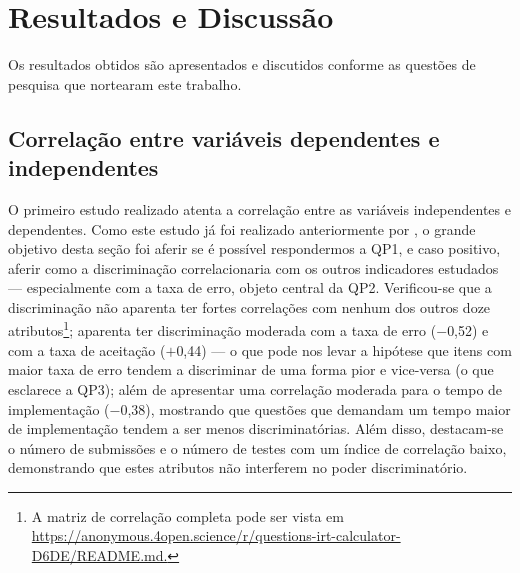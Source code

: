 \documentclass[12pt]{article}
\begin{document}
\section{Resultados e Discussão}


Os resultados obtidos são apresentados e discutidos conforme as questões de pesquisa que nortearam este trabalho.


\subsection{Correlação entre variáveis dependentes e independentes}
\label{sec:correlacao_variaveis}

O primeiro estudo realizado atenta a correlação entre as variáveis independentes e dependentes. Como este estudo já foi realizado anteriormente por \cite{marcos2021,elrik2022,jackson2023}, o grande objetivo desta seção foi aferir se é possível respondermos a QP1, e caso positivo, aferir como a discriminação correlacionaria com os outros indicadores estudados --- especialmente com a taxa de erro, objeto central da QP2. Verificou-se que a discriminação não aparenta ter fortes correlações com nenhum dos outros doze atributos\footnote{A matriz de correlação completa pode ser vista em \url{https://anonymous.4open.science/r/questions-irt-calculator-D6DE/README.md.}}; aparenta ter discriminação moderada com a taxa de erro ($-$0,52) e com a taxa de aceitação ($+$0,44) --- o que pode nos levar a hipótese que itens com maior taxa de erro tendem a discriminar de uma forma pior e vice-versa (o que esclarece a QP3); além de apresentar uma correlação moderada para o tempo de implementação ($-$0,38), mostrando que questões que demandam um tempo maior de implementação tendem a ser menos discriminatórias. Além disso, destacam-se o número de submissões e o número de testes com um índice de correlação baixo, demonstrando que estes atributos não interferem no poder discriminatório.

\end{document}
